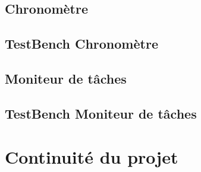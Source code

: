 \documentclass[a4paper,12pt]{report}
\begin{document}
		\subsection{Chronomètre}
			
		
		\subsection{TestBench Chronomètre}
			
			
		\subsection{Moniteur de tâches}
			
		
		\subsection{TestBench Moniteur de tâches}
			
		
	\section{Continuité du projet}
		\paragraph*{}
			
			
	\clearpage
\end{document}
